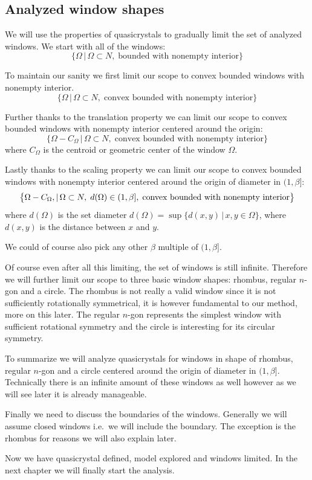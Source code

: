 \documentclass[text.tex]{subfiles}
\begin{document}
\subsection{Analyzed window shapes}
We will use the properties of quasicrystals to gradually limit the set of analyzed windows. We start with all of the windows: 
$$\big\{\Omega\,|\, \Omega\subset N ,\;\text{bounded with nonempty interior}\big\}$$

To maintain our sanity we first limit our scope to convex bounded windows with nonempty interior. 
$$\big\{\Omega\,|\, \Omega\subset N ,\;\text{convex bounded with nonempty interior}\big\}$$

Further thanks to the translation property we can limit our scope to convex bounded windows with nonempty interior centered around the origin: 
$$\big\{\Omega-C_\Omega\,|\, \Omega\subset N ,\;\text{convex bounded with nonempty interior}\big\}$$
where $C_\Omega$ is the centroid or geometric center of the window $\Omega$. 

Lastly thanks to the scaling property we can limit our scope to convex bounded windows with nonempty interior centered around the origin of diameter in $(1,\beta]$:
$$\big\{\Omega-C_\Omega\\,|\, \Omega\subset N ,\; d(\Omega)\in (1,\beta] ,\;\text{convex bounded with nonempty interior}\big\}$$
where $d(\Omega)$ is the set diameter $d(\Omega) = \sup\{d(x,y)\,|\,x,y\in\Omega\}$, where $d(x,y)$ is the distance between $x$ and $y$. 

\begin{remark}
We could of course also pick any other $\beta$ multiple of $(1,\beta]$. 
\end{remark}

Of course even after all this limiting, the set of windows is still infinite. Therefore we will further limit our scope to three basic window shapes: rhombus, regular $n$-gon and a circle. The rhombus is not really a valid window since it is not sufficiently rotationally symmetrical, it is however fundamental to our method, more on this later. The regular $n$-gon represents the simplest window with sufficient rotational symmetry and the circle is interesting for its circular symmetry. 

To summarize we will analyze quasicrystals for windows in shape of rhombus, regular $n$-gon and a circle centered around the origin of diameter in $(1,\beta]$. Technically there is an infinite amount of these windows as well however as we will see later it is already manageable. 

Finally we need to discuss the boundaries of the windows. Generally we will assume closed windows i.e.\ we will include the boundary. The exception is the rhombus for reasons we will also explain later. 

Now we have quasicrystal defined, model explored and windows limited. In the next chapter we will finally start the analysis. 
\end{document}
